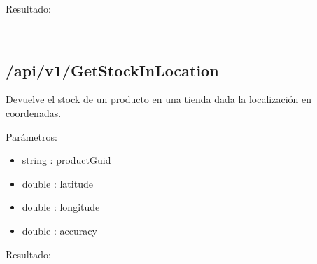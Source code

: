 Resultado:
\begin{lstlisting}
	
\end{lstlisting}

\subsection{/api/v1/GetStockInLocation}
Devuelve el stock de un producto en una tienda dada la localización en coordenadas.

Parámetros:
\begin{itemize}
	\item string : productGuid
	\item double : latitude
	\item double : longitude
	\item double : accuracy
\end{itemize}

Resultado:
\begin{lstlisting}
	
\end{lstlisting}
\chapterend